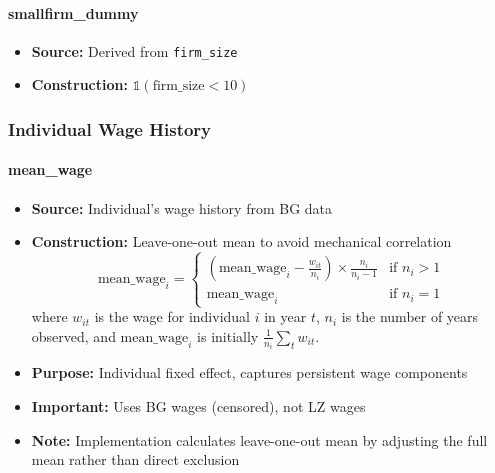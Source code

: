 \documentclass{article}
\begin{document}
\paragraph{smallfirm\_dummy}
\begin{itemize}
    \item \textbf{Source:} Derived from \texttt{firm\_size}
    \item \textbf{Construction:} $\mathbb{1}(\text{firm\_size} < 10)$
\end{itemize}

\subsubsection{Individual Wage History}

\paragraph{mean\_wage}
\begin{itemize}
    \item \textbf{Source:} Individual's wage history from BG data
    \item \textbf{Construction:} Leave-one-out mean to avoid mechanical correlation
    \begin{equation}
        \text{mean\_wage}_i = \begin{cases}
        (\text{mean\_wage}_i - \frac{w_{it}}{n_i}) \times \frac{n_i}{n_i-1} & \text{if } n_i > 1\\
        \text{mean\_wage}_i & \text{if } n_i = 1
        \end{cases}
    \end{equation}
    where $w_{it}$ is the wage for individual $i$ in year $t$, $n_i$ is the number of years observed, and $\text{mean\_wage}_i$ is initially $\frac{1}{n_i}\sum_t w_{it}$.
    \item \textbf{Purpose:} Individual fixed effect, captures persistent wage components
    \item \textbf{Important:} Uses BG wages (censored), not LZ wages
    \item \textbf{Note:} Implementation calculates leave-one-out mean by adjusting the full mean rather than direct exclusion
\end{itemize}
\end{document}
